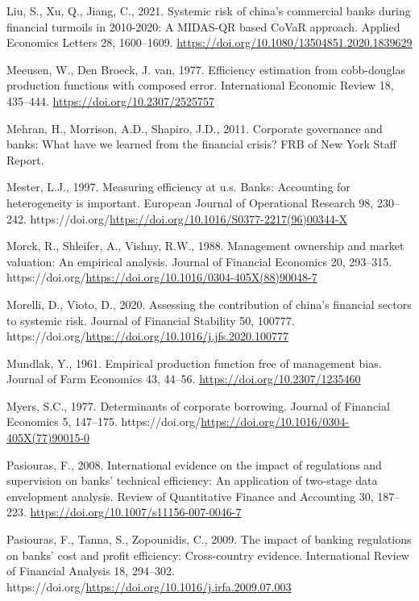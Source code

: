 \documentclass[
  letterpaper,
  DIV=11,
  numbers=noendperiod]{scrreprt}
\newlength{\cslhangindent}
\newenvironment{CSLReferences}[2] %
 {\begin{list}{}{%
  \setlength{\itemindent}{0pt}
  \setlength{\leftmargin}{0pt}
  \setlength{\parsep}{0pt}
  \ifodd #1
   \setlength{\leftmargin}{\cslhangindent}
   \setlength{\itemindent}{-1\cslhangindent}
  \fi
  \setlength{\itemsep}{#2\baselineskip}}}
 {\end{list}}
\begin{document}
\begin{CSLReferences}{1}{0}
Liu, S., Xu, Q., Jiang, C., 2021. Systemic risk of china's commercial
banks during financial turmoils in 2010-2020: A MIDAS-QR based CoVaR
approach. Applied Economics Letters 28, 1600--1609.
\url{https://doi.org/10.1080/13504851.2020.1839629}

Meeusen, W., Den Broeck, J. van, 1977. Efficiency estimation from
cobb-douglas production functions with composed error. International
Economic Review 18, 435--444. \url{https://doi.org/10.2307/2525757}

Mehran, H., Morrison, A.D., Shapiro, J.D., 2011. Corporate governance
and banks: What have we learned from the financial crisis? FRB of New
York Staff Report.

Mester, L.J., 1997. Measuring efficiency at u.s. Banks: Accounting for
heterogeneity is important. European Journal of Operational Research 98,
230--242.
https://doi.org/\url{https://doi.org/10.1016/S0377-2217(96)00344-X}

Morck, R., Shleifer, A., Vishny, R.W., 1988. Management ownership and
market valuation: An empirical analysis. Journal of Financial Economics
20, 293--315.
https://doi.org/\url{https://doi.org/10.1016/0304-405X(88)90048-7}

Morelli, D., Vioto, D., 2020. Assessing the contribution of china's
financial sectors to systemic risk. Journal of Financial Stability 50,
100777. https://doi.org/\url{https://doi.org/10.1016/j.jfs.2020.100777}

Mundlak, Y., 1961. Empirical production function free of management
bias. Journal of Farm Economics 43, 44--56.
\url{https://doi.org/10.2307/1235460}

Myers, S.C., 1977. Determinants of corporate borrowing. Journal of
Financial Economics 5, 147--175.
https://doi.org/\url{https://doi.org/10.1016/0304-405X(77)90015-0}

Pasiouras, F., 2008. International evidence on the impact of regulations
and supervision on banks' technical efficiency: An application of
two-stage data envelopment analysis. Review of Quantitative Finance and
Accounting 30, 187--223. \url{https://doi.org/10.1007/s11156-007-0046-7}

Pasiouras, F., Tanna, S., Zopounidis, C., 2009. The impact of banking
regulations on banks' cost and profit efficiency: Cross-country
evidence. International Review of Financial Analysis 18, 294--302.
https://doi.org/\url{https://doi.org/10.1016/j.irfa.2009.07.003}


\end{CSLReferences}
\end{document}
